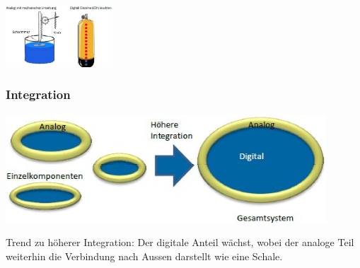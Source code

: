 	\includegraphics[width=0.3\textwidth]{pics/unterschied_analog_digital.jpg}
	
	\subsubsection{Integration}
		\begin{minipage}[c]{8 cm}
			\includegraphics[width=0.9\textwidth]{pics/analog_digital_integration.jpg}
		\end{minipage}
		\begin{minipage}[c]{10 cm}
			Trend zu höherer Integration: Der digitale Anteil wächst, wobei der analoge Teil weiterhin die Verbindung nach Aussen darstellt \lbrack wie eine Schale\rbrack.
		\end{minipage}
	
